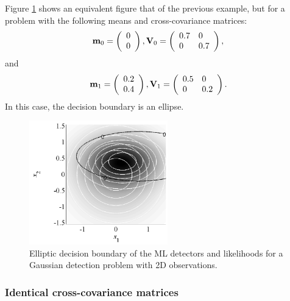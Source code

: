 \begin{example}
	Figure \ref{fig:DecGauss2Delip} shows an equivalent figure that of the previous example, but for a problem with the following means and cross-covariance matrices:
		\begin{equation*}
	{\bf m}_0 =  \left(\begin{array}{l}  0\\0  \end{array}\right), {\bf V}_0 = 
	\left(\begin{array}{ll} 0.7 & 0 \\ 0 & 0.7 \end{array} \right),
	\end{equation*}
	and
	\begin{equation*}
	{\bf m}_1 = \left(\begin{array}{l}  0.2 \\ 0.4 \end{array}\right), {\bf V}_1 = 
	\left(\begin{array}{ll} 0.5 & 0 \\ 0 & 0.2 \end{array} \right).
	\end{equation*}
	In this case, the decision boundary is an ellipse.
	\begin{figure}[htb]
		\begin{center}
			\includegraphics[width=6cm]{Figures/DecGauss2Delip.pdf}
			\caption{Elliptic decision boundary of the ML detectors and likelihoods for a Gaussian detection problem with 2D observations.}
			\label{fig:DecGauss2Delip}
		\end{center}
	\end{figure}
\end{example}

\subsubsection{Identical cross-covariance matrices}

